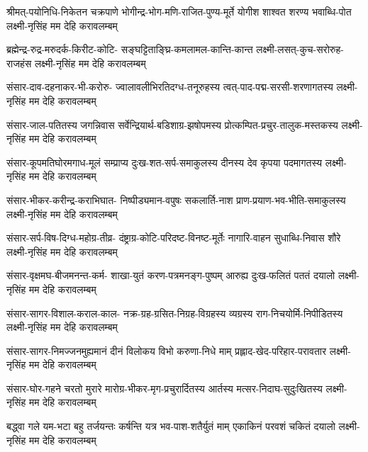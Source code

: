 


\fourlineindentedshloka
{श्रीमत्-पयोनिधि-निकेतन चक्रपाणे}
{भोगीन्द्र-भोग-मणि-राजित-पुण्य-मूर्ते}
{योगीश शाश्वत शरण्य भवाब्धि-पोत}
{लक्ष्मी-नृसिंह मम देहि करावलम्बम्}

\fourlineindentedshloka
{ब्रह्मेन्द्र-रुद्र-मरुदर्क-किरीट-कोटि-}
{सङ्घट्टिताङ्घ्रि-कमलामल-कान्ति-कान्त}
{लक्ष्मी-लसत्-कुच-सरोरुह-राजहंस}
{लक्ष्मी-नृसिंह मम देहि करावलम्बम्}

\fourlineindentedshloka
{संसार-दाव-दहनाकर-भी-करोरु-}
{ज्वालावलीभिरतिदग्ध-तनूरुहस्य}
{त्वत्-पाद-पद्म-सरसी-शरणागतस्य}
{लक्ष्मी-नृसिंह मम देहि करावलम्बम्}

\fourlineindentedshloka
{संसार-जाल-पतितस्य जगन्निवास}
{सर्वेन्द्रियार्थ-बडिशाग्र-झषोपमस्य}
{प्रोत्कम्पित-प्रचुर-तालुक-मस्तकस्य}
{लक्ष्मी-नृसिंह मम देहि करावलम्बम्}

\fourlineindentedshloka
{संसार-कूपमतिघोरमगाध-मूलं}
{सम्प्राप्य दुःख-शत-सर्प-समाकुलस्य}
{दीनस्य देव कृपया पदमागतस्य}
{लक्ष्मी-नृसिंह मम देहि करावलम्बम्}

\fourlineindentedshloka
{संसार-भीकर-करीन्द्र-कराभिघात-}
{निष्पीड्यमान-वपुषः सकलार्ति-नाश}
{प्राण-प्रयाण-भव-भीति-समाकुलस्य}
{लक्ष्मी-नृसिंह मम देहि करावलम्बम्}

\fourlineindentedshloka
{संसार-सर्प-विष-दिग्ध-महोग्र-तीव्र-}
{दंष्ट्राग्र-कोटि-परिदष्ट-विनष्ट-मूर्तेः}
{नागारि-वाहन सुधाब्धि-निवास शौरे}
{लक्ष्मी-नृसिंह मम देहि करावलम्बम्}

\fourlineindentedshloka
{संसार-वृक्षमघ-बीजमनन्त-कर्म-}
{शाखा-युतं करण-पत्रमनङ्ग-पुष्पम्}
{आरुह्य दुःख-फलितं पततं दयालो}
{लक्ष्मी-नृसिंह मम देहि करावलम्बम्}

\fourlineindentedshloka
{संसार-सागर-विशाल-कराल-काल-}
{नक्र-ग्रह-ग्रसित-निग्रह-विग्रहस्य}
{व्यग्रस्य राग-निचयोर्मि-निपीडितस्य}
{लक्ष्मी-नृसिंह मम देहि करावलम्बम्}

\fourlineindentedshloka
{संसार-सागर-निमज्जनमुह्यमानं}
{दीनं विलोकय विभो करुणा-निधे माम्}
{प्रह्लाद-खेद-परिहार-परावतार}
{लक्ष्मी-नृसिंह मम देहि करावलम्बम्}

\fourlineindentedshloka
{संसार-घोर-गहने चरतो मुरारे}
{मारोग्र-भीकर-मृग-प्रचुरार्दितस्य}
{आर्तस्य मत्सर-निदाघ-सुदुःखितस्य}
{लक्ष्मी-नृसिंह मम देहि करावलम्बम्}

\fourlineindentedshloka
{बद्\mbox{}ध्वा गले यम-भटा बहु तर्जयन्तः}
{कर्षन्ति यत्र भव-पाश-शतैर्युतं माम्}
{एकाकिनं परवशं चकितं दयालो}
{लक्ष्मी-नृसिंह मम देहि करावलम्बम्}

